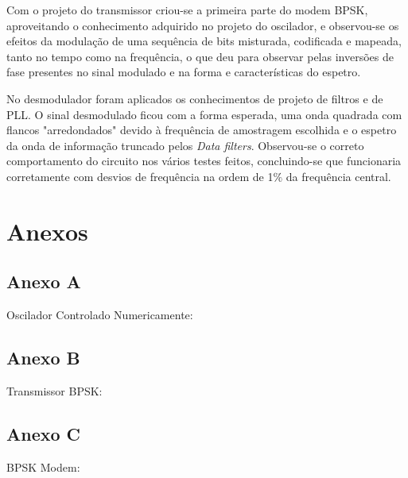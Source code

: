 \documentclass[11pt]{article}
\numberwithin{equation}{section}
\begin{document}
Com o projeto do transmissor criou-se a primeira parte do modem BPSK, aproveitando o conhecimento adquirido no projeto do oscilador, e observou-se os efeitos da modulação de uma sequência de bits misturada, codificada e mapeada, tanto no tempo como na frequência, o que deu para observar pelas inversões de fase presentes no sinal modulado e na forma e características do espetro.

No desmodulador foram aplicados os conhecimentos de projeto de filtros e de PLL. O sinal desmodulado ficou com a forma esperada, uma onda quadrada com flancos "arredondados" devido à frequência de amostragem escolhida e o espetro da onda de informação truncado pelos \textit{Data filters}. Observou-se o correto comportamento do circuito nos vários testes feitos, concluindo-se que funcionaria corretamente com desvios de frequência na ordem de 1$\%$ da frequência central.

\section{Anexos}
\subsection{Anexo A}
Oscilador Controlado Numericamente:


\subsection{Anexo B}
Transmissor BPSK:


\subsection{Anexo C}
BPSK Modem:

\end{document}
